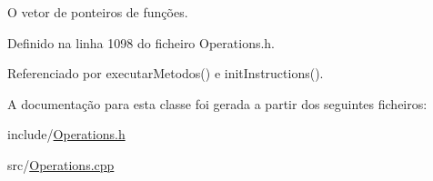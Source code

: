 O vetor de ponteiros de funções. 

Definido na linha 1098 do ficheiro Operations.\+h.



Referenciado por executar\+Metodos() e init\+Instructions().



A documentação para esta classe foi gerada a partir dos seguintes ficheiros\+:\begin{DoxyCompactItemize}
\item 
include/\hyperlink{Operations_8h}{Operations.\+h}\item 
src/\hyperlink{Operations_8cpp}{Operations.\+cpp}\end{DoxyCompactItemize}
